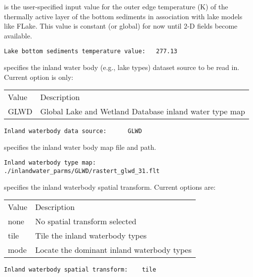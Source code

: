 
  is the user-specified
 input value for the outer edge temperature (K) of the thermally
 active layer of the bottom sediments in association with lake models
 like FLake.  This value is constant (or global) for now until
 2-D fields become available.
 

 \begin{Verbatim}[frame=single]
Lake bottom sediments temperature value:   277.13
 \end{Verbatim}

 
  specifies the inland water body
 (e.g., lake types) dataset source to be read in.  Current option is
 only:
  
 \begin{tabular}{ll}
 Value     & Description                  \\
 GLWD   & Global Lake and Wetland Database inland water type map \\
 \end{tabular}
 
 \begin{Verbatim}[frame=single]
Inland waterbody data source:      GLWD
 \end{Verbatim}

 
  specifies the inland water body
 map file and path.
 
 \begin{Verbatim}[frame=single]
Inland waterbody type map:  ./inlandwater_parms/GLWD/rastert_glwd_31.flt
 \end{Verbatim}

 
  specifies the inland
 waterbody spatial transform.
 Current options are:

 \begin{tabular}{ll}
 Value   & Description                     \\
  none   & No spatial transform selected   \\
  tile   & Tile the inland waterbody types \\
  mode   & Locate the dominant inland waterbody types \\
 \end{tabular}
 
 \begin{Verbatim}[frame=single]
Inland waterbody spatial transform:    tile
 \end{Verbatim}

 


